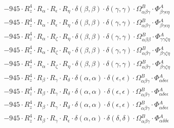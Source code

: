 \documentclass{article}
\begin{document}
\begin{subequations}
\begin{gather}
\begin{array}{c}
 \\[0.2em] 		 - 945 \cdot R_{z}^{4} \cdot R_{\alpha{}} \cdot R_{\epsilon{}} \cdot R_{\eta{}} \cdot \delta{}\left(\beta{}, \beta{}\right) \cdot \delta{}\left(\gamma{}, \gamma{}\right) \cdot \Omega{}^{B}_{\alpha{}\beta{}\gamma{}} \cdot \Phi{}^{A}_{\beta{}\gamma{}\epsilon{}\eta{}} 
 \\[0.2em] 		 - 945 \cdot R_{z}^{4} \cdot R_{\alpha{}} \cdot R_{\epsilon{}} \cdot R_{\eta{}} \cdot \delta{}\left(\beta{}, \beta{}\right) \cdot \delta{}\left(\gamma{}, \gamma{}\right) \cdot \Omega{}^{B}_{\alpha{}\beta{}\gamma{}} \cdot \Phi{}^{A}_{\beta{}\gamma{}\epsilon{}\eta{}} 
 \\[0.2em] 		 - 945 \cdot R_{z}^{4} \cdot R_{\alpha{}} \cdot R_{\zeta{}} \cdot R_{\eta{}} \cdot \delta{}\left(\beta{}, \beta{}\right) \cdot \delta{}\left(\gamma{}, \gamma{}\right) \cdot \Omega{}^{B}_{\alpha{}\beta{}\beta{}} \cdot \Phi{}^{A}_{\gamma{}\gamma{}\zeta{}\eta{}} 
 \\[0.2em] 		 - 945 \cdot R_{z}^{4} \cdot R_{\alpha{}} \cdot R_{\zeta{}} \cdot R_{\eta{}} \cdot \delta{}\left(\beta{}, \beta{}\right) \cdot \delta{}\left(\gamma{}, \gamma{}\right) \cdot \Omega{}^{B}_{\alpha{}\beta{}\gamma{}} \cdot \Phi{}^{A}_{\beta{}\gamma{}\zeta{}\eta{}} 
 \\[0.2em] 		 - 945 \cdot R_{z}^{4} \cdot R_{\alpha{}} \cdot R_{\zeta{}} \cdot R_{\eta{}} \cdot \delta{}\left(\beta{}, \beta{}\right) \cdot \delta{}\left(\gamma{}, \gamma{}\right) \cdot \Omega{}^{B}_{\alpha{}\beta{}\gamma{}} \cdot \Phi{}^{A}_{\beta{}\gamma{}\zeta{}\eta{}} 
 \\[0.2em] 		 - 945 \cdot R_{z}^{4} \cdot R_{\beta{}} \cdot R_{\gamma{}} \cdot R_{\delta{}} \cdot \delta{}\left(\alpha{}, \alpha{}\right) \cdot \delta{}\left(\epsilon{}, \epsilon{}\right) \cdot \Omega{}^{B}_{\alpha{}\beta{}\gamma{}} \cdot \Phi{}^{A}_{\alpha{}\delta{}\epsilon{}\epsilon{}} 
 \\[0.2em] 		 - 945 \cdot R_{z}^{4} \cdot R_{\beta{}} \cdot R_{\gamma{}} \cdot R_{\delta{}} \cdot \delta{}\left(\alpha{}, \alpha{}\right) \cdot \delta{}\left(\epsilon{}, \epsilon{}\right) \cdot \Omega{}^{B}_{\alpha{}\beta{}\gamma{}} \cdot \Phi{}^{A}_{\alpha{}\delta{}\epsilon{}\epsilon{}} 
 \\[0.2em] 		 - 945 \cdot R_{z}^{4} \cdot R_{\beta{}} \cdot R_{\gamma{}} \cdot R_{\delta{}} \cdot \delta{}\left(\alpha{}, \alpha{}\right) \cdot \delta{}\left(\epsilon{}, \epsilon{}\right) \cdot \Omega{}^{B}_{\alpha{}\beta{}\gamma{}} \cdot \Phi{}^{A}_{\alpha{}\delta{}\epsilon{}\epsilon{}} 
 \\[0.2em] 		 - 945 \cdot R_{z}^{4} \cdot R_{\beta{}} \cdot R_{\gamma{}} \cdot R_{\epsilon{}} \cdot \delta{}\left(\alpha{}, \alpha{}\right) \cdot \delta{}\left(\delta{}, \delta{}\right) \cdot \Omega{}^{B}_{\alpha{}\beta{}\gamma{}} \cdot \Phi{}^{A}_{\alpha{}\delta{}\delta{}\epsilon{}} 

\end{array}
\end{gather}
\end{subequations}
\end{document}
